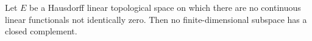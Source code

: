 Let $E$ be a Hausdorff linear topological space on which there are no continuous linear functionals not identically zero. Then no finite-dimensional subspace has a closed complement.
